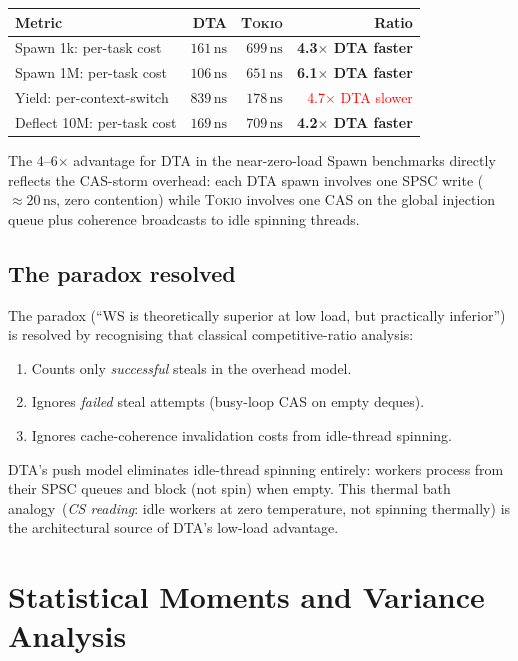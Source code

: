 \documentclass[11pt,a4paper]{article}
\newcommand{\physics}[2]{#1\ \textnormal{(\emph{CS reading}: #2)}}
\newcommand{\dtact}{\textsc{DTA}}
\newcommand{\tokio}{\textsc{Tokio}}
\begin{document}
\begin{center}
\begin{tabular}{lrrr}
\toprule
Metric & \dtact & \tokio & Ratio \\
\midrule
Spawn 1k: per-task cost & $161\,\mathrm{ns}$ & $699\,\mathrm{ns}$ & \textbf{4.3$\times$ DTA faster} \\
Spawn 1M: per-task cost & $106\,\mathrm{ns}$ & $651\,\mathrm{ns}$ & \textbf{6.1$\times$ DTA faster} \\
Yield: per-context-switch & $839\,\mathrm{ns}$ & $178\,\mathrm{ns}$ & \textcolor{red}{4.7$\times$ DTA slower} \\
Deflect 10M: per-task cost & $169\,\mathrm{ns}$ & $709\,\mathrm{ns}$ & \textbf{4.2$\times$ DTA faster} \\
\bottomrule
\end{tabular}
\end{center}

The 4--6$\times$ advantage for DTA in the near-zero-load Spawn benchmarks
directly reflects the CAS-storm overhead: each \dtact{} spawn involves
one SPSC write ($\approx 20\,\mathrm{ns}$, zero contention) while
\tokio{} involves one CAS on the global injection queue plus coherence
broadcasts to idle spinning threads.

\subsection{The paradox resolved}

The paradox (``WS is theoretically superior at low load, but practically inferior'')
is resolved by recognising that classical competitive-ratio analysis:
\begin{enumerate}
  \item Counts only \emph{successful} steals in the overhead model.
  \item Ignores \emph{failed} steal attempts (busy-loop CAS on empty deques).
  \item Ignores cache-coherence invalidation costs from idle-thread spinning.
\end{enumerate}
DTA's push model eliminates idle-thread spinning entirely: workers
process from their SPSC queues and block (not spin) when empty.
This \physics{thermal bath analogy}{idle workers at zero temperature, not
spinning thermally} is the architectural source of DTA's low-load advantage.


\section{Statistical Moments and Variance Analysis}
\label{sec:variance_analysis}
\end{document}
